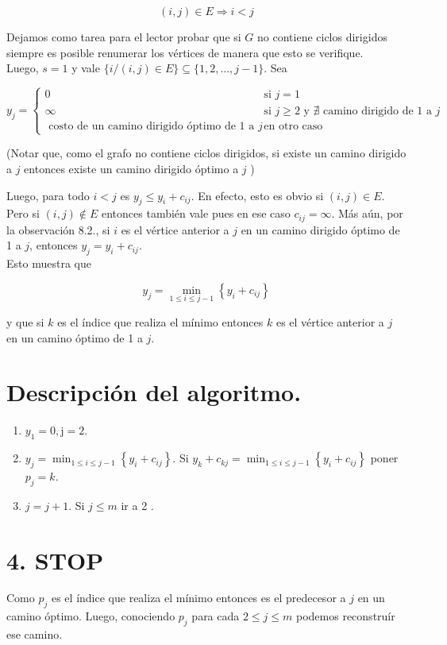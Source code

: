 \documentclass[10pt]{article}
\begin{document}
$$
(i, j) \in E \Longrightarrow i<j
$$

Dejamos como tarea para el lector probar que si $G$ no contiene ciclos dirigidos siempre es posible renumerar los vértices de manera que esto se verifique.\\
Luego, $s=1$ y vale $\{i /(i, j) \in E\} \subseteq\{1,2, \ldots, j-1\}$. Sea

$$
y_{j}= \begin{cases}0 & \text { si } j=1 \\ \infty & \text { si } j \geq 2 \text { y } \nexists \text { camino dirigido de } 1 \text { a } j \\ \text { costo de un camino dirigido óptimo de } 1 \text { a } j & \text { en otro caso }\end{cases}
$$

(Notar que, como el grafo no contiene ciclos dirigidos, si existe un camino dirigido a $j$ entonces existe un camino dirigido óptimo a $j$ )

Luego, para todo $i<j$ es $y_{j} \leq y_{i}+c_{i j}$. En efecto, esto es obvio si $(i, j) \in E$. Pero si $(i, j) \notin E$ entonces también vale pues en ese caso $c_{i j}=\infty$. Más aún, por la observación 8.2., si $i$ es el vértice anterior a $j$ en un camino dirigido óptimo de 1 a $j$, entonces $y_{j}=y_{i}+c_{i j}$.\\
Esto muestra que

$$
y_{j}=\min _{1 \leq i \leq j-1}\left\{y_{i}+c_{i j}\right\}
$$

y que si $k$ es el índice que realiza el mínimo entonces $k$ es el vértice anterior a $j$ en un camino óptimo de 1 a $j$.

\section*{Descripción del algoritmo.}
\begin{enumerate}
  \item $y_{1}=0, \mathrm{j}=2$.
  \item $y_{j}=\min _{1 \leq i \leq j-1}\left\{y_{i}+c_{i j}\right\}$. Si $y_{k}+c_{k j}=\min _{1 \leq i \leq j-1}\left\{y_{i}+c_{i j}\right\}$ poner $p_{j}=k$.
  \item $j=j+1$. Si $j \leq m$ ir a 2 .
\end{enumerate}

\section*{4. STOP}
Como $p_{j}$ es el índice que realiza el mínimo entonces es el predecesor a $j$ en un camino óptimo. Luego, conociendo $p_{j}$ para cada $2 \leq j \leq m$ podemos reconstruír ese camino.
\end{document}
